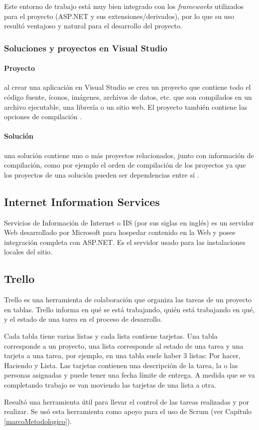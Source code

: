 Este entorno de trabajo está muy bien integrado con los \textit{frameworks} utilizados para el proyecto (ASP.NET y sus extensiones/derivados), por lo que su uso resultó ventajoso y natural para el desarrollo del proyecto.

\subsubsection{Soluciones y proyectos en Visual Studio}
\paragraph{Proyecto} al crear una aplicación en Visual Studio se crea un proyecto que contiene todo el código fuente, íconos, imágenes, archivos de datos, etc. que son compilados en un archivo ejecutable, una librería o un sitio web. El proyecto también contiene las opciones de compilación \cite{visualStudioSolutionMicrosoft}.
\paragraph{Solución} una solución contiene uno o más proyectos relacionados, junto con información de compilación, como por ejemplo el orden de compilación de los proyectos ya que los proyectos de una solución pueden ser dependencias entre sí \cite{visualStudioSolutionMicrosoft}.

\subsection{Internet Information Services}
Servicios de Información de Internet o IIS \cite{IISMicrosoft} (por sus siglas en inglés) es un servidor Web desarrollado por Microsoft para hospedar contenido en la Web y posee integración completa con ASP.NET. Es el servidor usado para las instalaciones locales del sitio.

\subsection{Trello}
Trello \cite{trelloAbout} es una herramienta de colaboración que organiza las tareas de un proyecto en tablas. Trello informa en qué se está trabajando, quién está trabajando en qué, y el estado de una tarea en el proceso de desarrollo.

Cada tabla tiene varias listas y cada lista contiene tarjetas. Una tabla corresponde a un proyecto, una lista corresponde al estado de una tarea y una tarjeta a una tarea, por ejemplo, en una tabla suele haber 3 listas: Por hacer, Haciendo y Lista. Las tarjetas contienen una descripción de la tarea, la o las personas asignadas y puede tener una fecha límite de entrega. A medida que se va completando trabajo se van moviendo las tarjetas de una lista a otra.

Resultó una herramienta útil para llevar el control de las tareas realizadas y por realizar. Se usó esta herramienta como apoyo para el uso de Scrum (ver Capítulo \ref{marcoMetodologico}).